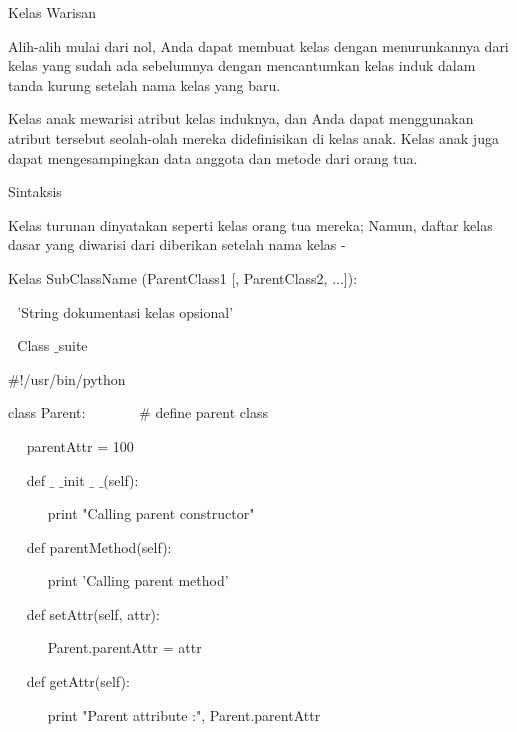 \documentclass[a4paper,12pt]{report}
\begin{document}
\vspace{14pt}
\noindent 
Kelas Warisan \par
\vspace{12pt}
\noindent 
Alih-alih mulai dari nol, Anda dapat membuat kelas dengan menurunkannya dari kelas yang sudah ada sebelumnya dengan mencantumkan kelas induk dalam tanda kurung setelah nama kelas yang baru. \par
\vspace{12pt}
\noindent 
Kelas anak mewarisi atribut kelas induknya, dan Anda dapat menggunakan atribut tersebut seolah-olah mereka didefinisikan di kelas anak. Kelas anak juga dapat mengesampingkan data anggota dan metode dari orang tua. \par
\noindent 
Sintaksis \par
\vspace{12pt}
\noindent 
Kelas turunan dinyatakan seperti kelas orang tua mereka; Namun, daftar kelas dasar yang diwarisi dari diberikan setelah nama kelas - \par
\vspace{12pt}
\noindent 
Kelas SubClassName (ParentClass1 [, ParentClass2, ...]): \par
\noindent 
 $  $ $  $ $  $'String dokumentasi kelas opsional' \par
\noindent 
 $  $ $  $ $  $Class $  \_  $suite \par
\noindent 
 $  \#  $!/usr/bin/python \par
\vspace{12pt}
\noindent 
class Parent:~~~~~~~  $  \#  $ define parent class \par
\noindent 
~~ parentAttr = 100 \par
\noindent 
~~ def  $  \_  $ $  \_  $init $  \_  $ $  \_  $(self): \par
\noindent 
~~~~~ print "Calling parent constructor" \par
\vspace{12pt}
\noindent 
~~ def parentMethod(self): \par
\noindent 
~~~~~ print 'Calling parent method' \par
\vspace{12pt}
\noindent 
~~ def setAttr(self, attr): \par
\noindent 
~~~~~ Parent.parentAttr = attr \par
\vspace{12pt}
\noindent 
~~ def getAttr(self): \par
\noindent 
~~~~~ print "Parent attribute :", Parent.parentAttr \par
\end{document}
